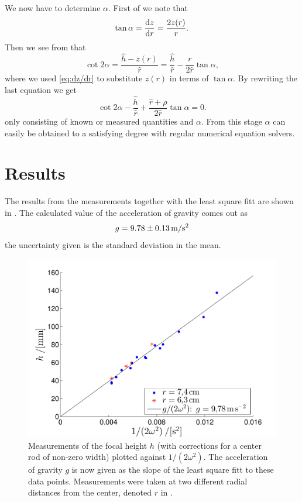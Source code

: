 \documentclass[11pt,towcolumn, swedish, english]{article}
\begin{document}
We now have to determine $\alpha$. First of we note that
\begin{equation}\label{eq:dz/dr}
\tan\alpha=\frac{\mathrm{d} z}{\mathrm{d} r}=\frac{2 z(r)}{r}.
\end{equation}
Then we see from  that 
\begin{equation*}
\cot 2\alpha =\frac{\hat{h} - z(r)}{\hat{r}} 
= \frac{\hat{h}}{\hat{r}}-\frac{r}{2\hat{r}}\tan\alpha,
\end{equation*}
where we used \eqref{eq:dz/dr} to substitute $z(r)$ in terms of
$\tan\alpha$. By rewriting the last equation we get
\begin{equation*}
\cot 2\alpha 
-\frac{\hat{h}}{\hat{r}}
+\frac{\hat{r}+\rho}{2\hat{r}}\tan\alpha  = 0.
\end{equation*}
only consisting of known or measured quantities and $\alpha$. From
this stage $\alpha$ can easily be obtained to a satisfying degree with
regular numerical equation solvers.

\section{Results}
The results from the measurements together with the least square fitt
are shown in . The calculated value of the
acceleration of gravity comes out as
\begin{equation*}
g=\unit[9.78\pm 0.13]{m/s^2}
\end{equation*}
the uncertainty given is the standard deviation in the mean.


\begin{figure}\centering 
\includegraphics[width=.65\linewidth]{g_minsta_kvadrat.pdf}
\caption{\label{fig:data} Measurements of the focal height $h$ (with
  corrections for a center rod of non-zero width) plotted against
  $1/(2\omega^2)$. The acceleration of gravity $g$ is now given as the
  slope of the least square fitt to these data points. Measurements
  were taken at two different radial distances from the center,
  denoted $r$ in .
}
\end{figure}
\end{document}
